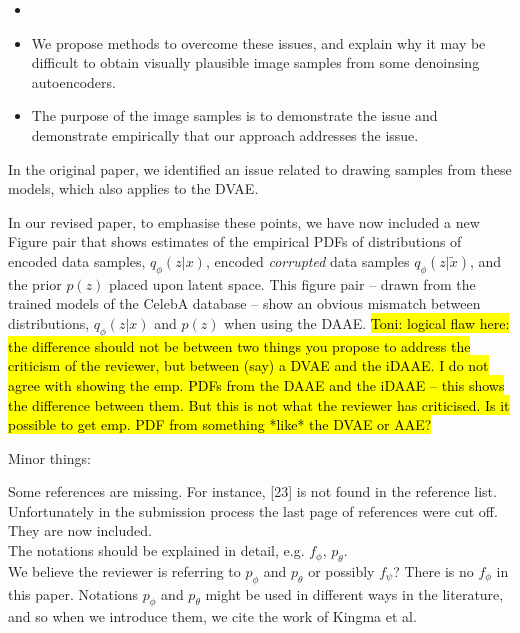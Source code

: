 \documentclass{article}
\begin{document}
\begin{itemize}
    \item 
    \item We propose methods to overcome these issues, and explain why it may be difficult to obtain visually plausible image samples from some denoinsing autoencoders.
    \item {\color{red} The purpose of the image samples is to demonstrate the issue and demonstrate empirically that our approach addresses the issue.}
\end{itemize}

In the original paper, we identified  an issue related to drawing samples from these models, which also applies to the DVAE.

In our revised paper, to emphasise these points, we have now included a new Figure pair that shows estimates of the empirical PDFs of distributions of encoded data samples, $q_\phi(z|x)$, encoded {\em corrupted} data samples $q_\phi(z|\tilde{x})$, and the prior $p(z)$ placed upon latent space.  This figure pair -- drawn from the trained models of the CelebA database -- show an obvious mismatch between distributions, $q_\phi(z|x)$ and $p(z)$ when using the DAAE. \hl{Toni: logical flaw here: the difference should not be between two things you propose to address the criticism of the reviewer, but between (say) a DVAE and the iDAAE.  I do not agree with showing the emp. PDFs from the DAAE and the iDAAE -- this shows the difference between them. But this is not what the reviewer has criticised.  Is it possible to get emp. PDF from something *like* the DVAE or AAE?} 


Minor things: \newline

{\color{blue}
Some references are missing. For instance, [23] is not found in the reference list.}\\

Unfortunately in the submission process the last page of references were cut off. They are now included.\\

{\color{blue}
The notations should be explained in detail, e.g. $f_\phi$, $p_\theta$.} \\

We believe the reviewer is referring to $p_\phi$ and $p_\theta$ or possibly $f_\psi$? There is no $f_\phi$ in this paper. Notations $p_\phi$ and $p_\theta$ might be used in different ways in the literature, and so when we introduce them, we cite the work of Kingma et al.\\
\end{document}
